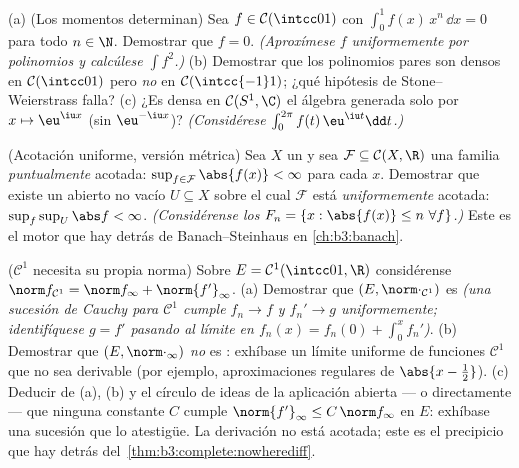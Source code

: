 \begin{exercise}[$\star\star$]\label{exo:b3:complete:9}
(a) (Los momentos determinan) Sea $f \in \mathcal C(\intcc01)$ con
$\int_0^1 f(x)\,x^n\,\dd x = 0$ para todo $n \in \N$. Demostrar que $f =
0$. \emph{(Aproxímese $f$ uniformemente por polinomios y calcúlese
$\int f^2$.)}
(b) Demostrar que los polinomios pares son densos en $\mathcal
C(\intcc01)$ pero \emph{no} en $\mathcal C(\intcc{-1}1)$; ¿qué hipótesis
de Stone--Weierstrass falla? (c) ¿Es densa en $\mathcal C(S^1, \C)$ el
álgebra generada solo por $x \mapsto \eu^{\iu x}$ (sin $\eu^{-\iu x}$)?
\emph{(Considérese $\int_0^{2\pi}f(t)\,\eu^{\iu t}\dd t$.)}
\end{exercise}

\begin{exercise}[$\star\star\star$]\label{exo:b3:complete:10}
(Acotación uniforme, versión métrica) Sea $X$ un
 y sea
$\mathcal F \subseteq \mathcal C(X, \R)$ una familia \emph{puntualmente}
acotada: $\sup_{f \in \mathcal
F}\abs{f(x)} < \infty$ para cada $x$. Demostrar que existe un abierto no
vacío $U \subseteq X$ sobre el cual $\mathcal F$ está
\emph{uniformemente} acotada: $\sup_{f}\sup_U \abs f < \infty$.
\emph{(Considérense los $F_n = \{x : \abs{f(x)} \leq n\ \forall f\}$.)}
Este es el motor que hay detrás de Banach--Steinhaus en
\cref{ch:b3:banach}.
\end{exercise}

\begin{exercise}[$\star\star$]\label{exo:b3:complete:11}
($\mathcal C^1$ necesita su propia norma) Sobre $E = \mathcal
C^1(\intcc01, \R)$ considérense $\norm f_{\mathcal C^1} = \norm
f_\infty + \norm{f'}_\infty$. (a) Demostrar que
$(E, \norm\cdot_{\mathcal C^1})$ es
 \emph{(una sucesión de
Cauchy para $\mathcal C^1$ cumple $f_n \to f$ y $f_n' \to g$
uniformemente; identifíquese $g = f'$ pasando al límite en
$f_n(x) = f_n(0) + \int_0^xf_n'$)}. (b) Demostrar que
$(E, \norm\cdot_\infty)$ \emph{no} es
: exhíbase un límite uniforme
de funciones $\mathcal C^1$ que no sea derivable (por ejemplo,
aproximaciones regulares de
$\abs{x - \tfrac12}$).
(c) Deducir de (a), (b) y el círculo de ideas de la aplicación abierta
--- o directamente --- que ninguna constante $C$ cumple
$\norm{f'}_\infty \leq C\,\norm f_\infty$ en $E$: exhíbase una sucesión
que lo atestigüe. La derivación no está acotada; este es el precipicio
que hay detrás del~\cref{thm:b3:complete:nowherediff}.
\end{exercise}


